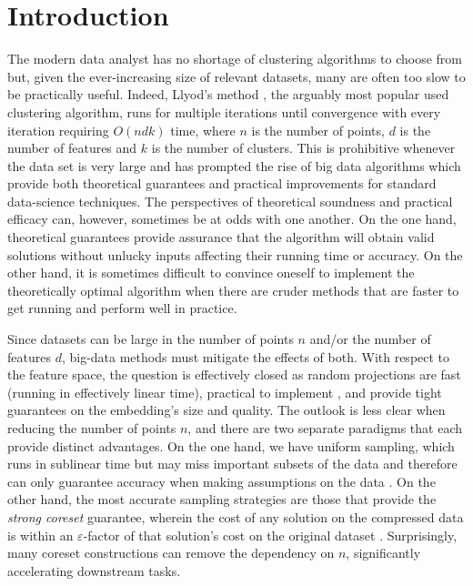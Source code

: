 \section{Introduction}

The modern data analyst has no shortage of clustering algorithms to choose from but, given the ever-increasing size of relevant datasets, many are often
too slow to be practically useful. 
Indeed, Llyod's method \cite{Lloyd82}, the arguably most popular used clustering algorithm, runs for multiple iterations until convergence with every iteration requiring $O(ndk)$ time, where $n$ is the number of points, $d$ is the number of features and $k$ is the number of clusters. This is prohibitive whenever the data set is very large and has prompted the rise of big data algorithms which provide both theoretical guarantees and
practical improvements for standard data-science techniques. The perspectives
of theoretical soundness and practical efficacy can, however, sometimes be at odds with one another. On the one hand, theoretical guarantees provide assurance that
the algorithm will obtain valid solutions without unlucky inputs affecting their running time or accuracy. On the other hand, it is sometimes difficult to convince
oneself to implement the theoretically optimal algorithm when there are cruder methods that are faster to get running and perform well in practice.

Since datasets can be large in the number of points $n$ and/or the number of features $d$, big-data methods must mitigate the effects of both.
With respect to the feature space, the question is effectively closed as random projections are fast (running in effectively linear time), practical to
implement \cite{makarychev2019performance}, and provide tight guarantees on the embedding's size and quality. The outlook is less clear when reducing the number of points $n$, and there are
two separate paradigms that each provide distinct advantages. 
On the one hand, we have uniform sampling, which runs in sublinear time but may miss important subsets of
the data and therefore can only guarantee accuracy when making assumptions on the data \cite{HuangJL23}.  On the other hand, the most accurate sampling strategies are those that provide the \emph{strong coreset}
guarantee, wherein the cost of any solution on the compressed data is within an $\varepsilon$-factor of that solution's cost on the original dataset \cite{CSS21}.
Surprisingly, many coreset constructions can remove the dependency on $n$, significantly accelerating downstream tasks.

